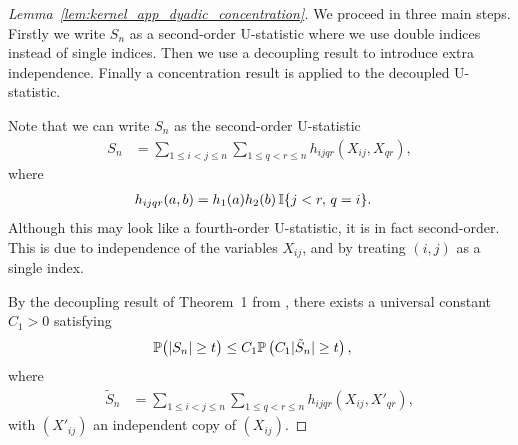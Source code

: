 \begin{proof}[Lemma~\ref{lem:kernel_app_dyadic_concentration}]

  We proceed in three main steps.
  Firstly we write $S_n$ as a second-order U-statistic
  where we use double indices instead of single indices.
  Then we use a decoupling result to introduce extra independence.
  Finally a concentration result is applied
  to the decoupled U-statistic.


  Note that we can write $S_n$ as
  the second-order U-statistic
  \begin{align*}
    S_n
    &=
    \sum_{1 \leq i < j \leq n}
    \sum_{1 \leq q < r \leq n}
    h_{i j q r}
    (X_{i j}, X_{qr}),
  \end{align*}
  where
  \begin{align*}
    h_{i j q r}
    (a,b)
    &=
    h_1(a) h_2(b) \,
    \I\{j<r,\, q=i\}.
  \end{align*}
  Although this may look like a fourth-order
  U-statistic,
  it is in fact second-order.
  This is due to independence of the variables
  $X_{i j}$,
  and by treating $(i,j)$ as a single index.


  By the decoupling result of Theorem~1
  from \citet{delapena1995decoupling}, there exists a universal
  constant $C_1 > 0$ satisfying
  \begin{align*}
    \P\big(
      |S_n| \geq t
    \big)
    &\leq
    C_1 \P\left(
      C_1 |\tilde S_n| \geq t
    \right),
  \end{align*}
  where
  \begin{align*}
    \tilde S_n
    &=
    \sum_{1 \leq i < j \leq n}
    \sum_{1 \leq q < r \leq n}
    h_{i j q r}
    (X_{i j}, X'_{qr}),
  \end{align*}
  with $(X'_{i j})$
  an independent copy of $(X_{i j})$.



\end{proof}
